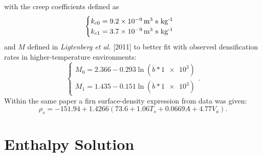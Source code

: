 \documentclass{article}%
\newcommand{\sups}[1]{\ensuremath{^{\textrm{#1}}}}
\begin{document}
with the creep coefficients defined as
  $$
  \begin{cases}
    k_{c0} = \text{\SI{9.2e-9} m\sups{3} s kg\sups{-1}} \\
    k_{c1} = \text{\SI{3.7e-9} m\sups{3} s kg\sups{-1}}  
  \end{cases}
  $$
and $M$ defined in \emph{Ligtenberg et al.} [2011] to better fit with observed densification rates in higher-temperature environments:
  $$
  \begin{cases}
    M_0 = 2.366 - 0.293\ln(\dot{b}*\SI{1e3})\\
    M_1 = 1.435 - 0.151\ln(\dot{b}*\SI{1e3})
  \end{cases}.
  $$
Within the same paper a firn surface-density expression from data was given:
  $$ \rho_s = -151.94 + 1.4266(73.6 + 1.06T_s + 0.0669A + 4.77V_a).$$


\section{Enthalpy Solution}
\end{document}
